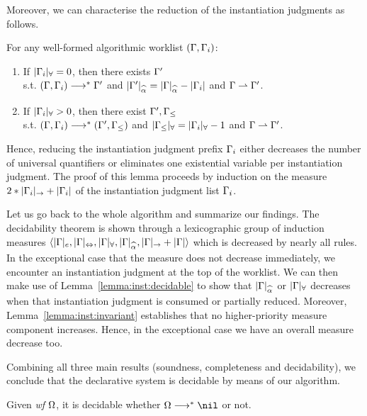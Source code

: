 Moreover, we can characterise the reduction of the instantiation judgments as follows.
\begin{lemma}\label{lemma:inst:decidable}
For any well-formed algorithmic worklist $(\Gamma, \Gamma_i)$:
\begin{enumerate}[1)]
    \item If $|\Gamma_i|_\forall = 0$,
        then there exists $\Gamma'$\\
        s.t. $(\Gamma, \Gamma_i) \longrightarrow^* \Gamma'$ and $|\Gm'|_{\al} = |\Gm|_{\al} - |\Gm_i|$ and $\Gamma\rightharpoonup\Gamma'$.
    \item If $|\Gamma_i|_\forall > 0$,
        then there exist $\Gamma', \Gamma_\le$\\
        s.t. $(\Gamma, \Gamma_i) \longrightarrow^* (\Gamma', \Gamma_\le)$ and $|\Gamma_\le|_\forall = |\Gamma_i|_\forall - 1$ and $\Gamma\rightharpoonup\Gamma'$.
\end{enumerate}
\end{lemma}
Hence, reducing the instantiation judgment prefix $\Gamma_i$ either
decreases the number of universal quantifiers or 
eliminates one existential variable per instantiation judgment.
The proof of this lemma proceeds by induction on the measure $2*|\Gamma_i|_\to + |\Gamma_i|$
of the instantiation judgment list $\Gamma_i$.

Let us go back to the whole algorithm and summarize our findings.
The decidability theorem is shown through a lexicographic group of induction measures
$\langle |\Gm|_e, |\Gm|_\Leftrightarrow, |\Gm|_\forall, |\Gm|_{\al}, |\Gm|_\to + |\Gm| \rangle$
which is decreased by nearly all rules.
In the exceptional case that the measure does not decrease immediately, 
we encounter an instantiation judgment at the top of the worklist. We can then
make use of Lemma~\ref{lemma:inst:decidable} to show that $|\Gm|_{\al}$ or $|\Gamma|_\forall$ decreases
when that instantiation judgment is consumed or partially reduced.
Moreover, Lemma~\ref{lemma:inst:invariant} establishes
that no higher-priority measure component increases.
Hence, in the exceptional case we have an overall measure decrease too.

Combining all three main results (soundness, completeness and decidability), we conclude that the declarative system is decidable
by means of our algorithm.
\begin{corollary}
Given \emph{wf }$\Omega$, it is decidable whether $\Om\redto\nil$ or not.
\end{corollary}

